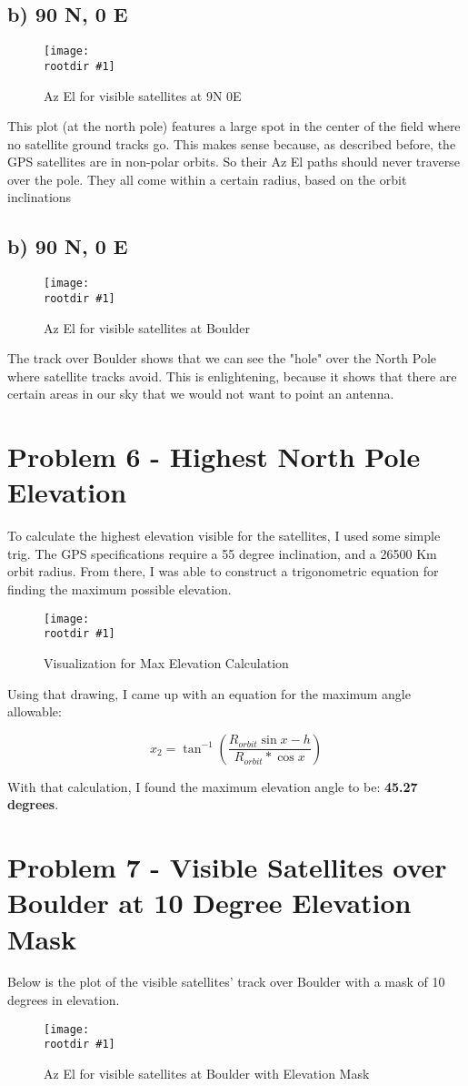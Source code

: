 \documentclass[12pt,a4paper,oneside]{article}
\newcommand{\parens} [1] {\left(  #1  \right)}
\newcommand{\rootdir}{./Figures/}
\newcommand{\figH}[3]{
			\begin{figure}[H]
				\centering
				\texttt{[image: \\rootdir \#1]}
				\caption{#2}
				\label{#3}
			\end{figure}
			}
\begin{document}
\subsection{b) 90 N, 0 E}
\figH{VisAzEl90-0.eps}{Az El for visible satellites at 9N 0E}{fig:AzEl900}
This plot (at the north pole) features a large spot in the center of the field where no satellite ground tracks go. This makes sense because, as described before, the GPS satellites are in non-polar orbits. So their Az El paths should never traverse over the pole. They all come within a certain radius, based on the orbit inclinations

\subsection{b) 90 N, 0 E}
\figH{VisAzElBoulder.eps}{Az El for visible satellites at Boulder}{fig:AzElBoulder}
The track over Boulder shows that we can see the "hole" over the North Pole where satellite tracks avoid. This is enlightening, because it shows that there are certain areas in our sky that we would not want to point an antenna. 

\section{Problem 6 - Highest North Pole Elevation}
To calculate the highest elevation visible for the satellites, I used some simple trig. The GPS specifications require a 55 degree inclination, and a 26500 Km orbit radius. From there, I was able to construct a trigonometric equation for finding the maximum possible elevation. 
 
\figH{Angles.png}{Visualization for Max Elevation Calculation}{fig:MaxEl}
Using that drawing, I came up with an equation for the maximum angle allowable:

\begin{equation}
	x_2 = \tan^{-1}\parens{\frac{R_{orbit}\sin x - h}{R_{orbit}*\cos x}}
\end{equation}

With that calculation, I found the maximum elevation angle to be: \textbf{45.27 degrees}.

\section{Problem 7 - Visible Satellites over Boulder at 10 Degree Elevation Mask}
Below is the plot of the visible satellites' track over Boulder with a mask of 10 degrees in elevation. 
\figH{VisAzElBoulder10deg.eps}{Az El for visible satellites at Boulder with Elevation Mask}{fig:AzElBoulder10deg}
\end{document}

